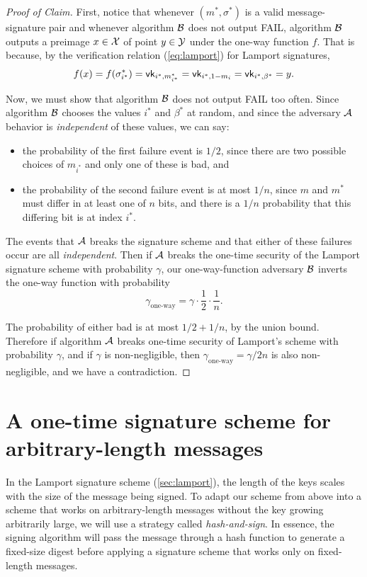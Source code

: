 \begin{proof}[Proof of Claim]
First, notice that whenever $(m^*, \sigma^*)$ is a valid message-signature
pair and whenever algorithm $\mathcal{B}$ does not output FAIL, algorithm $\mathcal{B}$
outputs a preimage $x \in \mathcal{X}$ of point $y \in \mathcal{Y}$ under the one-way function $f$.
That is because, by the verification relation (\ref{eq:lamport}) for Lamport signatures,
\[f(x) = f(\sigma^*_{i^*}) = \mathsf{vk}_{i^*,m^*_{i^*}} = \mathsf{vk}_{i^*, 1 - m_i} = \mathsf{vk}_{i^*, \beta^*} = y.\]

Now, we must show that algorithm $\mathcal{B}$ does not output FAIL too often.
Since algorithm $\mathcal{B}$ chooses the values $i^*$ and $\beta^*$ at random,
and since the adversary $\mathcal{A}$ behavior is \emph{independent} of these values,
we can say:
  \begin{itemize}
    \item the probability of the first failure event is $1/2$,
          since there are two possible choices of $m_{i^*}$ and only 
          one of these is bad, and 
    \item the probability of the second failure event is at most $1/n$,
          since $m$ and $m^*$ must differ in at least one of $n$ bits,
          and there is a $1/n$ probability that this differing bit is
          at index $i^*$.
  \end{itemize}

The events that $\mathcal{A}$ breaks the signature scheme
and that either of these failures occur are all \emph{independent}.
Then if $\mathcal{A}$ breaks the one-time security of the Lamport signature scheme with probability $\gamma$,
our one-way-function adversary $\mathcal{B}$
inverts the one-way function with probability
\[ \gamma_\text{one-way} = \gamma \cdot \frac{1}{2} \cdot \frac{1}{n}.\]

The probability of either bad is at most $1/2 + 1/n$,
by the union bound.
Therefore if algorithm $\mathcal{A}$ breaks one-time security of Lamport's
scheme with probability $\gamma$, and
if $\gamma$ is non-negligible, then $\gamma_\text{one-way} = \gamma/2n$
is also non-negligible, and we have a contradiction.
\end{proof}


\section{A one-time signature scheme for arbitrary-length messages}
In the Lamport signature scheme (\cref{sec:lamport}), the length of the keys scales with the size of the message being signed.
To adapt our scheme from above into a scheme that works on arbitrary-length messages without the key growing arbitrarily large, we will use a strategy called \emph{hash-and-sign}.
In essence, the signing algorithm will pass the message through a hash function to generate a fixed-size digest before applying a signature
scheme that works only on fixed-length messages.

